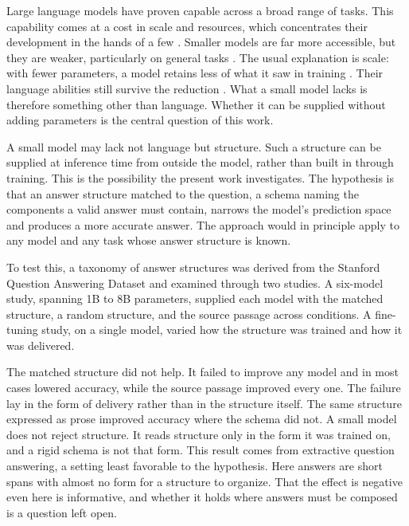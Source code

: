 \documentclass[master]{thesis}
\begin{document}
Large language models have proven capable across a broad range of tasks. This capability comes at a cost in scale and resources, which concentrates their development in the hands of a few \cite{eloundou2023gpts, strubell2019energy}. Smaller models are far more accessible, but they are weaker, particularly on general tasks \cite{smalllmsready2024, slm_survey2024}. The usual explanation is scale: with fewer parameters, a model retains less of what it saw in training \cite{kaplan2020scaling, costofdownscaling2023}. Their language abilities still survive the reduction \cite{linguistic_competence_scale2025, emergent_reducedscale2024}. What a small model lacks is therefore something other than language. Whether it can be supplied without adding parameters is the central question of this work.

A small model may lack not language but structure. Such a structure can be supplied at inference time from outside the model, rather than built in through training. This is the possibility the present work investigates. The hypothesis is that an answer structure matched to the question, a schema naming the components a valid answer must contain, narrows the model's prediction space and produces a more accurate answer. The approach would in principle apply to any model and any task whose answer structure is known.

To test this, a taxonomy of answer structures was derived from the Stanford Question Answering Dataset and examined through two studies. A six-model study, spanning 1B to 8B parameters, supplied each model with the matched structure, a random structure, and the source passage across conditions. A fine-tuning study, on a single model, varied how the structure was trained and how it was delivered.

The matched structure did not help. It failed to improve any model and in most cases lowered accuracy, while the source passage improved every one. The failure lay in the form of delivery rather than in the structure itself. The same structure expressed as prose improved accuracy where the schema did not. A small model does not reject structure. It reads structure only in the form it was trained on, and a rigid schema is not that form. This result comes from extractive question answering, a setting least favorable to the hypothesis. Here answers are short spans with almost no form for a structure to organize. That the effect is negative even here is informative, and whether it holds where answers must be composed is a question left open.
\end{document}

